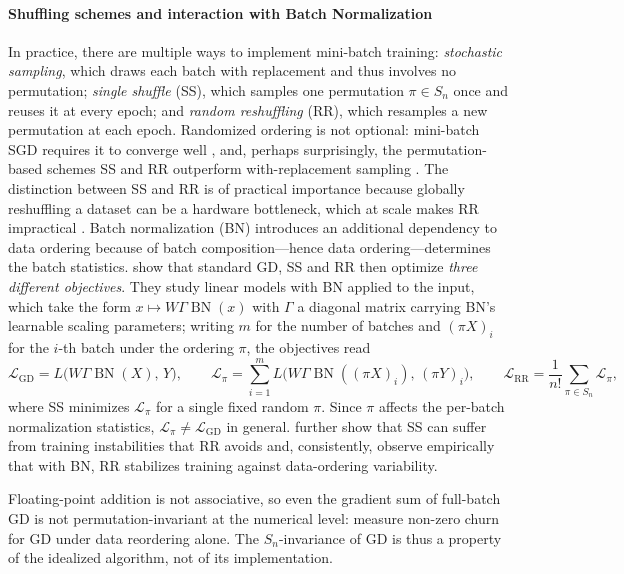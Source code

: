 \documentclass[mathematics,review,submit,moreauthors]{Definitions/mdpi}
\begin{document}
\paragraph{Shuffling schemes and interaction with Batch Normalization}
In practice, there are multiple ways to implement mini-batch training: \emph{stochastic sampling}, which draws each batch with replacement and thus involves no permutation; \emph{single shuffle} (SS), which samples one permutation $\pi\in S_n$ once and reuses it at every epoch; and \emph{random reshuffling} (RR), which resamples a new permutation at each epoch.
Randomized ordering is not optional: mini-batch SGD requires it to converge well \citep{xu2024vj}, and, perhaps surprisingly, the permutation-based schemes SS and RR outperform with-replacement sampling \citep{koloskova2024p4icml}.
The distinction between SS and RR is of practical importance because globally reshuffling a dataset can be a hardware bottleneck, which at scale makes RR impractical \citep{nguyen20222iipdpsi,koloskova2024p4icml,xu2024vj}.
Batch normalization (BN) introduces an additional dependency to data ordering because of batch composition---hence data ordering---determines the batch statistics.
\citet{wu2023p4icml} show that standard GD, SS and RR then optimize \emph{three different objectives}.
They study linear models with BN applied to the input, which take the form $x \mapsto W\Gamma\operatorname{BN}(x)$ with $\Gamma$ a diagonal matrix carrying BN's learnable scaling parameters; writing $m$ for the number of batches and $(\pi X)_i$ for the $i$-th batch under the ordering $\pi$, the objectives read
$$
\mathcal{L}_{\mathrm{GD}} = L\big(W\Gamma\operatorname{BN}(X),\, Y\big), \qquad
\mathcal{L}_{\pi} = \sum_{i=1}^{m} L\big(W\Gamma\operatorname{BN}((\pi X)_i),\, (\pi Y)_i\big), \qquad
\mathcal{L}_{\mathrm{RR}} = \frac{1}{n!}\sum_{\pi\in S_n} \mathcal{L}_{\pi},
$$
where SS minimizes $\mathcal{L}_\pi$ for a single fixed random $\pi$.
Since $\pi$ affects the per-batch normalization statistics, $\mathcal{L}_\pi \neq \mathcal{L}_{\mathrm{GD}}$ in general.
\citet{wu2023p4icml} further show that SS can suffer from training instabilities that RR avoids and, consistently, \citet{zhuang2022pmls} observe empirically that with BN, RR stabilizes training against data-ordering variability.

\begin{Remark}
    Floating-point addition is not associative, so even the gradient sum of full-batch GD is not permutation-invariant at the numerical level: \citet{zhuang2022pmls} measure non-zero churn for GD under data reordering alone.
    The $S_n$-invariance of GD is thus a property of the idealized algorithm, not of its implementation.
\end{Remark}
\end{document}
